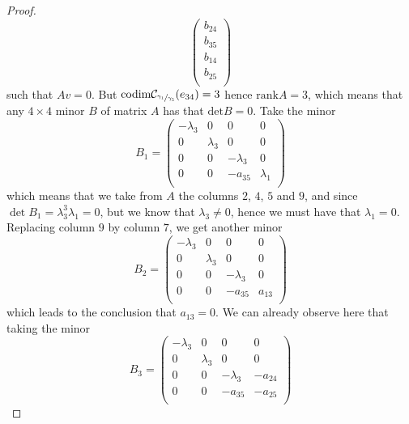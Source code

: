 \documentclass[12pt]{article}
\begin{document}
\begin{proof}
\[\begin{pmatrix}
b_{24}\\
b_{35}\\
b_{14}\\
b_{25}\\
\end{pmatrix}
\]
such that $Av=0$. But $\mathrm{codim}\mathcal{C}_{\sfrac{\gamma_1}{\gamma_5}}(e_{34})=3$ hence $\mathrm{rank}A=3$, which means that any $4\times 4$ minor $B$ of matrix $A$ has that $\mathrm{det}B=0$. Take the minor \[
B_1=\begin{pmatrix}
-\lambda_3 & 0 & 0 & 0\\
0 & \lambda_3 & 0 & 0\\
0 & 0 & -\lambda_3 & 0\\
0 & 0 & -a_{35} & \lambda_1\\ 
\end{pmatrix}
\]
which means that we take from $A$ the columns $2$, $4$, $5$ and $9$, and since $\det B_1=\lambda_3^3\lambda_1=0$, but we know that $\lambda_3\neq 0$, hence we must have that $\lambda_1=0$. Replacing column $9$ by column $7$, we get another minor  \[
B_2=\begin{pmatrix}
-\lambda_3 & 0 & 0 & 0\\
0 & \lambda_3 & 0 & 0\\
0 & 0 & -\lambda_3 & 0\\
0 & 0 & -a_{35} & a_{13}\\ 
\end{pmatrix}
\]
which leads to the conclusion that $a_{13}=0$. We can already observe here that taking the minor \[
B_3=\begin{pmatrix}
-\lambda_3 & 0 & 0 & 0\\
0 & \lambda_3 & 0 & 0\\
0 & 0 & -\lambda_3 & -a_{24}\\
0 & 0 & -a_{35} & -a_{25}\\ 
\end{pmatrix}
\]

\end{proof}
\end{document}
